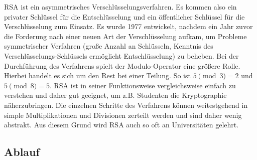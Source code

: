 \documentclass[conference,10pt,a4paper,twocolumn]{IEEEtran}
\begin{document}
RSA ist ein asymmetrisches Verschlüsselungsverfahren. Es kommen also ein privater Schlüssel für die Entschlüsselung und ein öffentlicher Schlüssel für die Verschlüsselung zum Einsatz. Es wurde 1977 entwickelt, nachdem ein Jahr zuvor die Forderung nach einer neuen Art der Verschlüsselung aufkam, um Probleme symmetrischer Verfahren (große Anzahl an Schlüsseln, Kenntnis des Verschlüsselungs-Schlüssels ermöglicht Entschlüsselung) zu beheben. Bei der Durchführung des Verfahrens spielt der Modulo-Operator eine größere Rolle. Hierbei handelt es sich um den Rest bei einer Teilung. So ist \begin{math}5 \pmod 3 = 2\end{math} und \begin{math}5 \pmod 8 = 5\end{math}. RSA ist in seiner Funktionsweise vergleichsweise einfach zu verstehen  und daher gut geeignet, um z.B. Studenten die Kryptographie näherzubringen. Die einzelnen Schritte des Verfahrens können weitestgehend in simple Multiplikationen und Divisionen zerteilt werden und sind daher wenig abstrakt. Aus diesem Grund wird RSA auch so oft an Universitäten gelehrt.

\subsection{Ablauf}
\end{document}
